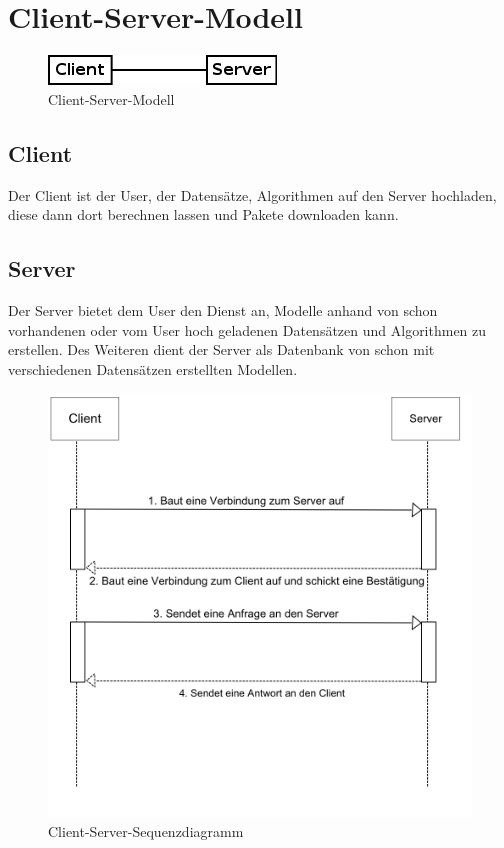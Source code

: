 %
	
	
	
\section{Client-Server-Modell}

\begin{figure}[h]
	\centering
	\includegraphics[scale=0.6]{../Grafik/Diagramm/Pattern/ClientServer/Kontext.png}
	\caption[]{Client-Server-Modell}
\end{figure}

\subsection*{Client}
Der Client ist der User, der Datensätze, Algorithmen auf den Server hochladen, diese dann dort berechnen lassen und Pakete downloaden kann.

\subsection*{Server}
Der Server bietet dem User den Dienst an, Modelle anhand von schon vorhandenen oder vom User hoch geladenen Datensätzen und Algorithmen zu erstellen. Des Weiteren dient der Server als Datenbank von schon mit verschiedenen Datensätzen erstellten Modellen.

\begin{figure}[h]
	\centering
	\includegraphics[scale=0.3]{../Grafik/Diagramm/Pattern/ClientServer/Sequenzdiagramm.png}
		\caption[]{Client-Server-Sequenzdiagramm}
\end{figure}

